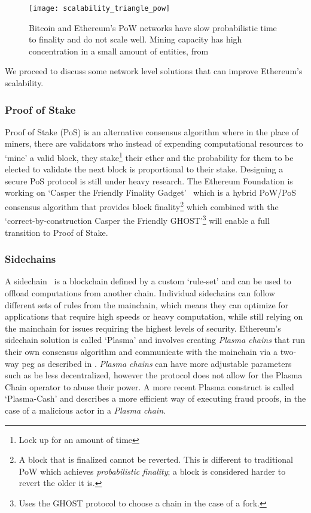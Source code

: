 \begin{figure}[ht!]
    \centering
    \texttt{[image: scalability\_triangle\_pow]}
    \caption{Bitcoin and Ethereum's PoW networks have slow probabilistic time to finality and do not scale well. Mining capacity has high concentration in a small amount of entities, from \cite{scaling-trustless-models}}
    \label{fig:scalability_triangle_pow}
\end{figure}

We proceed to discuss some network level solutions that can improve Ethereum's scalability.

\subsubsection*{Proof of Stake}
Proof of Stake (PoS) is an alternative consensus algorithm where in the place of miners, there are validators who instead of expending computational resources to `mine' a valid block, they stake\footnote{Lock up for an amount of time} their ether and the probability for them to be elected to validate the next block is proportional to their stake. Designing a secure PoS protocol is still under heavy research. The Ethereum Foundation is working on `Casper the Friendly Finality Gadget'~\cite{casperffg} which is a hybrid PoW/PoS consensus algorithm that provides block finality\footnote{A block that is finalized cannot be reverted. This is different to traditional PoW which achieves \textit{probabilistic finality}; a block is considered harder to revert the older it is.} which combined with the `correct-by-construction Casper the Friendly GHOST'\footnote{Uses the GHOST protocol to choose a chain in the case of a fork.} \cite{caspertfg} will enable a full transition to Proof of Stake. 

\subsubsection*{Sidechains}
A sidechain~\cite{sidechains} is a blockchain defined by a custom `rule-set' and can be used to offload computations from another chain. Individual sidechains can follow different sets of rules from the mainchain, which means they can optimize for applications that require high speeds or heavy computation, while still relying on the mainchain for issues requiring the highest levels of security. Ethereum's sidechain solution is called `Plasma' \cite{plasma} and involves creating \textit{Plasma chains} that run their own consensus algorithm and communicate with the mainchain via a two-way peg as described in \cite{sidechains}. \textit{Plasma chains} can have more adjustable parameters such as be less decentralized, however the protocol does not allow for the Plasma Chain operator to abuse their power. A more recent Plasma construct is called `Plasma-Cash' \cite{plasmacash} and describes a more efficient way of executing fraud proofs, in the case of a malicious actor in a \textit{Plasma chain}.

